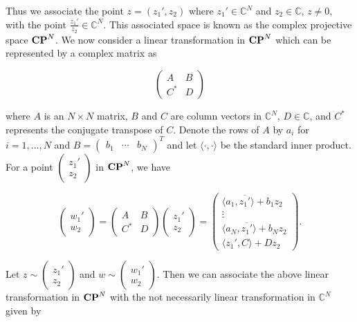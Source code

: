 \documentclass{amsart}
\theoremstyle{theorem}
\theoremstyle{lemma}
\theoremstyle{definition}
\begin{document}
Thus we associate the point $z=(z_1', z_2)$  where $z_1' \in \mathbb{C}^N$ and $z_2 \in \mathbb{C}$, $z \neq 0$, with the point $\frac{z_1'}{z_2} \in \mathbb{C}^N$. This associated space is known as the complex projective space ${\bf CP}^N$. We now consider a linear transformation in ${\bf CP}^N$ which can be represented by a complex matrix as

\begin{equation*}
  \begin{pmatrix}
        A & B \\
        C^* & D
     \end{pmatrix}
\end{equation*}

\noindent where $A$ is an $N \times N$ matrix, $B$ and $C$ are column vectors in $\mathbb{C}^N$, $D \in \mathbb{C}$, and $C^*$ represents the conjugate transpose of $C$. Denote the rows of $A$ by $a_i$ for $i=1,...,N$ and  $B=\begin{pmatrix}b_1 & \cdots & b_N \end{pmatrix}^T$ and let $\langle \cdot, \cdot \rangle$ be the standard inner product. For a point $\begin{pmatrix}z_1'  \\  z_2\end{pmatrix}$ in ${\bf CP}^N$, we have

$$\begin{pmatrix}w_1'  \\  w_2\end{pmatrix}=\begin{pmatrix}A & B  \\  C^* & D \end{pmatrix}\begin{pmatrix}z_1'  \\  z_2\end{pmatrix}=\begin{pmatrix}\langle a_1, \overline{z_1'}\rangle+b_1z_2  \\ \vdots \\ \langle a_N, \overline{z_1'}\rangle+b_Nz_2 \\ \langle z_1',C \rangle+Dz_2 \end{pmatrix}.$$

Let $z \sim \begin{pmatrix}z_1'  \\  z_2\end{pmatrix}$ and $w \sim \begin{pmatrix}w_1'  \\  w_2\end{pmatrix}$. Then we can associate the above linear transformation in ${\bf CP}^N$ with the not necessarily linear transformation in $\mathbb{C}^N$ given by
\end{document}
